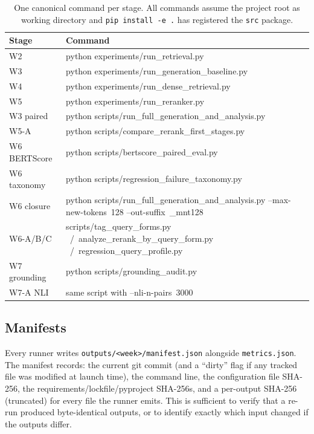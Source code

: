 \documentclass[11pt,a4paper]{article}
\begin{document}
\begin{table}[H]
  \centering\small
  \caption{One canonical command per stage.  All commands assume
  the project root as working directory and \texttt{pip install -e
  .} has registered the \texttt{src} package.}
  \label{tab:repro-cmds}
  \begin{tabularx}{\linewidth}{l>{\ttfamily\raggedright\arraybackslash}X}
    \toprule
    Stage & \normalfont Command \\
    \midrule
    W2  & python experiments/run\_retrieval.py \\
    W3  & python experiments/run\_generation\_baseline.py \\
    W4  & python experiments/run\_dense\_retrieval.py \\
    W5  & python experiments/run\_reranker.py \\
    W3 paired    & python scripts/run\_full\_generation\_and\_analysis.py \\
    W5-A         & python scripts/compare\_rerank\_first\_stages.py \\
    W6 BERTScore & python scripts/bertscore\_paired\_eval.py \\
    W6 taxonomy  & python scripts/regression\_failure\_taxonomy.py \\
    W6 closure   & python scripts/run\_full\_generation\_and\_analysis.py \mbox{--max-new-tokens}~128 \mbox{--out-suffix}~\_mnt128 \\
    W6-A/B/C     & scripts/tag\_query\_forms.py \ /\ analyze\_rerank\_by\_query\_form.py \ /\ regression\_query\_profile.py \\
    W7 grounding & python scripts/grounding\_audit.py \\
    W7-A NLI     & same script with \mbox{--nli-n-pairs}~3000 \\
    \bottomrule
  \end{tabularx}
\end{table}

\subsection{Manifests}

Every runner writes \texttt{outputs/<week>/manifest.json} alongside
\texttt{metrics.json}.  The manifest records: the current git
commit (and a ``dirty'' flag if any tracked file was modified at
launch time), the command line, the configuration file SHA-256,
the requirements/lockfile/pyproject SHA-256s, and a per-output
SHA-256 (truncated) for every file the runner emits.  This is
sufficient to verify that a re-run produced byte-identical outputs,
or to identify exactly which input changed if the outputs differ.
\end{document}
